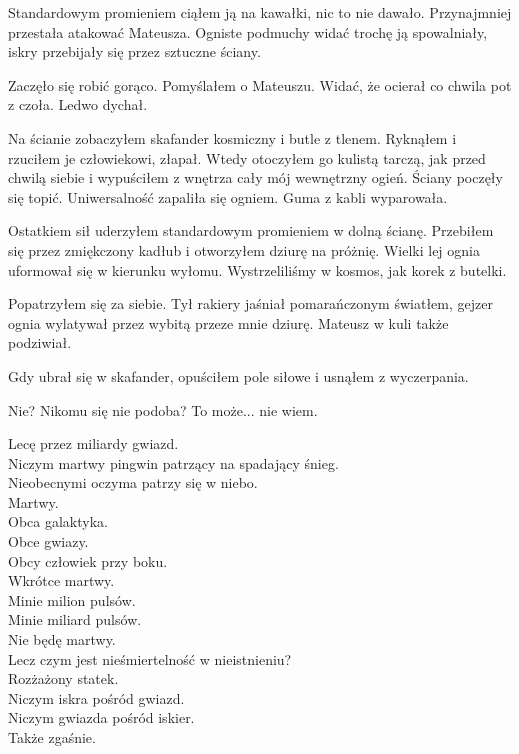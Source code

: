 Standardowym promieniem ciąłem ją na kawałki, nic to nie dawało.
Przynajmniej przestała atakować Mateusza.
Ogniste podmuchy widać trochę ją spowalniały, iskry przebijały się przez sztuczne ściany.

Zaczęło się robić gorąco. Pomyślałem o Mateuszu. 
Widać, że ocierał co chwila pot z czoła.
Ledwo dychał.

Na ścianie zobaczyłem skafander kosmiczny i butle z tlenem.
Ryknąłem i rzuciłem je człowiekowi, złapał.
Wtedy otoczyłem go kulistą tarczą, jak przed chwilą siebie i wypuściłem z wnętrza cały mój wewnętrzny ogień.
Ściany poczęły się topić.
Uniwersalność zapaliła się ogniem. 
Guma z kabli wyparowała. 

Ostatkiem sił uderzyłem standardowym promieniem w dolną ścianę.
Przebiłem się przez zmiękczony kadłub i otworzyłem dziurę na próżnię.
Wielki lej ognia uformował się w kierunku wyłomu.
Wystrzeliliśmy w kosmos, jak korek z butelki.

Popatrzyłem się za siebie. Tył rakiery jaśniał pomarańczonym światłem, gejzer ognia wylatywał przez wybitą przeze mnie dziurę.
Mateusz w kuli także podziwiał.

Gdy ubrał się w skafander, opuściłem pole siłowe i usnąłem z wyczerpania.

\divider{}

Nie?
Nikomu się nie podoba?
To może... nie wiem.

\divider{}

Lecę przez miliardy gwiazd. \\
Niczym martwy pingwin patrzący na spadający śnieg. \\
Nieobecnymi oczyma patrzy się w niebo. \\
Martwy. \\

Obca galaktyka. \\
Obce gwiazy. \\
Obcy człowiek przy boku. \\
Wkrótce martwy. \\

Minie milion pulsów. \\
Minie miliard pulsów. \\
Nie będę martwy. \\
Lecz czym jest nieśmiertelność w nieistnieniu? \\

Rozżażony statek. \\
Niczym iskra pośród gwiazd. \\
Niczym gwiazda pośród iskier. \\
Także zgaśnie. \\

